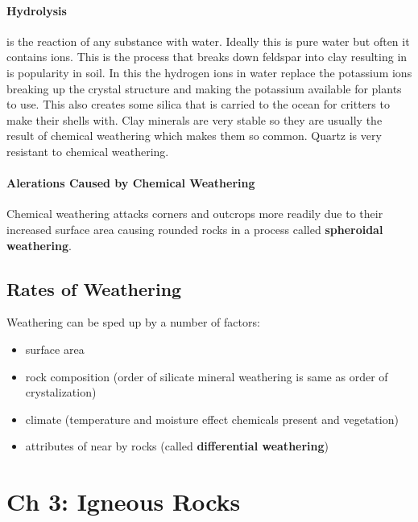 \documentclass{article}
\begin{document}
\paragraph{Hydrolysis} %
\label{par:hydrolysis}
is the reaction of any substance with water. Ideally this is pure water but often it contains ions. This is the process that breaks down feldspar into clay resulting in is popularity in soil. In this the hydrogen ions in water replace the potassium ions breaking up the crystal structure and making the potassium available for plants to use. This also creates some silica that is carried to the ocean for critters to make their shells with. Clay minerals are very stable so they are usually the result of chemical weathering which makes them so common. Quartz is very resistant to chemical weathering.

\paragraph{Alerations Caused by Chemical Weathering} %
\label{par:alerations_caused_by_chemical_weathering}
Chemical weathering attacks corners and outcrops more readily due to their increased surface area causing rounded rocks in a process called \textbf{spheroidal weathering}.

\subsection{Rates of Weathering} %
\label{sub:rates_of_weathering}
Weathering can be sped up by a number of factors:
\begin{itemize}
    \item surface area
    \item rock composition (order of silicate mineral weathering is same as order of crystalization)
    \item climate (temperature and moisture effect chemicals present and vegetation)
    \item attributes of near by rocks (called \textbf{differential weathering})
\end{itemize}



\section{Ch 3: Igneous Rocks} %
\label{sec:ch_3_igneous_rocks}
\end{document}
